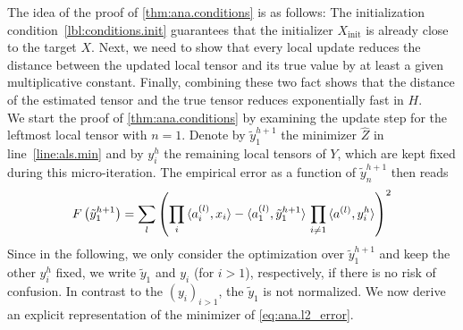 The idea of the proof of \cref{thm:ana.conditions} is as follows:
The initialization condition~\ref{lbl:conditions.init} guarantees that the initializer $X_\mathrm{init}$ is already close to the target $X$.
Next, we need to show that every local update reduces the distance between the updated local tensor and its true value by at least a given multiplicative constant.
Finally, combining these two fact shows that the distance of the estimated tensor and the true tensor reduces exponentially fast in $H$.\\



We start the proof of \cref{thm:ana.conditions} by examining the update step for the leftmost local tensor with $n = 1$.
Denote by $\tilde y^{h+1}_1$ the minimizer $\hat Z$ in line~\ref{line:als.min} and by $y^h_i$ the remaining local tensors of $Y$, which are kept fixed during this micro-iteration.
The empirical error as a function of $\tilde y^{h+1}_n$ then reads
\[
  F\left(\tilde y^{h+1}_1\right)
  = \sum_l {\left(  \prod_i \braket{a^{(l)}_i, x_i} - \braket{a^{(l)}_1, \tilde y^{h+1}_1} \, \prod_{i \neq 1} \braket{a^{(l)}, y^{h}_i} \right)}^2
  \label{eq:ana.l2_error}
\]
Since in the following, we only consider the optimization over $\tilde y^{h+1}_1$ and keep the other $y^h_i$ fixed, we write $\tilde y_1$ and $y_i$ (for $i > 1$), respectively, if there is no risk of confusion.
In contrast to the $(y_i)_{i > 1}$, the $\tilde y_1$ is not normalized.
We now derive an explicit representation of the minimizer of \cref{eq:ana.l2_error}.

